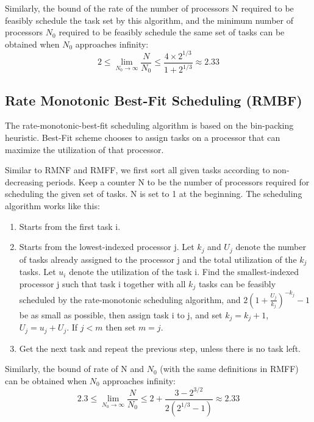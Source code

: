 \documentclass[preprint,12pt]{elsarticle}
\begin{document}
Similarly, the bound of the rate of the number of processors N required to be feasibly schedule the task set by this algorithm, and the minimum number of processors $N_0$ required to be feasibly schedule the same set of tasks can be obtained when $N_0$ approaches infinity: 
\begin{equation}
    2 \leq \lim_{N_0 \to \infty} \frac{N}{N_0} \leq \frac{4 \times 2^{1/3}}{1 + 2^{1/3}} \approx 2.33
\end{equation}

\subsection{Rate Monotonic Best-Fit Scheduling (RMBF)}
The rate-monotonic-best-fit scheduling \cite{oh1993tight} algorithm is based on the bin-packing heuristic. Best-Fit scheme chooses to assign tasks on a processor that can maximize the utilization of that processor. 

Similar to RMNF and RMFF, we first sort all given tasks according to non-decreasing periods. Keep a counter N to be the number of processors required for scheduling the given set of tasks. N is set to 1 at the beginning. The scheduling algorithm works like this:
\begin{enumerate}
\item Starts from the first task i. 
\item Starts from the lowest-indexed processor j. Let $k_j$ and $U_j$ denote the number of tasks already assigned to the processor j and the total utilization of the $k_j$ tasks. Let $u_i$ denote the utilization of the task i. Find the smallest-indexed processor j such that task i together with all $k_j$ tasks can be feasibly scheduled by the rate-monotonic scheduling algorithm, and $2(1 + \frac{U_j}{k_j})^{-k_j} - 1 $ be as small as possible, then assign task i to j, and set $k_j = k_j + 1$, $U_j = u_j + U_j$. If $j < m$ then set $m = j$. 
\item Get the next task and repeat the previous step, unless there is no task left.
\end{enumerate}

Similarly, the bound of rate of N and $N_0$ (with the same definitions in RMFF) can be obtained when $N_0$ approaches infinity: 
\begin{equation}
    2.3 \leq \lim_{N_0 \to \infty} \frac{N}{N_0} \leq 2 + \frac{3 - 2^{3/2}}{2(2^{1/3} - 1)} \approx 2.33
\end{equation}
\end{document}
